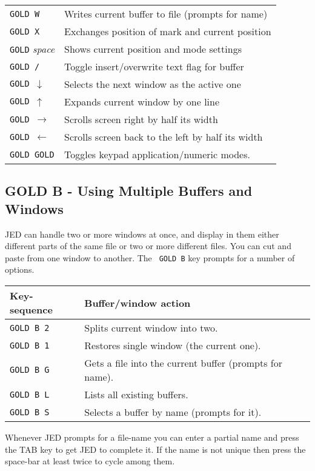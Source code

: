\documentclass[twoside,11pt]{article}
\newcommand{\xlabel}[1]{}
\begin{document}
\begin{center}
\begin{tabular}{|ll|}
\texttt{GOLD W} & Writes current buffer to file (prompts for name) \\
\texttt{GOLD X} & Exchanges position of mark and current position \\
\texttt{GOLD} \textit{space}   & Shows current position and mode settings \\
\texttt{GOLD /} & Toggle insert/overwrite text flag for buffer \\
\texttt{GOLD $\downarrow$}  & Selects the next window as the active one\\
\texttt{GOLD $\uparrow$  }  & Expands current window by one line \\
\texttt{GOLD $\rightarrow$} & Scrolls screen right by half its width \\
\texttt{GOLD $\leftarrow$ } & Scrolls screen back to the left by half its width \\
\texttt{GOLD GOLD}          & Toggles keypad application/numeric modes.\\
\hline
\end{tabular}
\end{center}


\subsection{\xlabel{gold_b_-_using_multiple_buffers_and_windows}%
GOLD B - Using Multiple Buffers and Windows}
\label{gold_b_-_using_multiple_buffers_and_windows}
\label{buff-ops}

JED can handle two or more windows at once, and display in them either
different parts of the same file or two or more different files.  You
can cut and paste from one window to another. The {\tt
GOLD B} key prompts for a number of options.

\begin{center}
\begin{tabular}{|ll|}
\hline
Key-sequence & Buffer/window action \\
\hline
\texttt{GOLD B 2} & Splits current window into two.\\
\texttt{GOLD B 1} & Restores single window (the current one).\\
\texttt{GOLD B G} & Gets a file into the current buffer (prompts for name).\\
\texttt{GOLD B L} & Lists all existing buffers.\\
\texttt{GOLD B S} & Selects a buffer by name (prompts for it).\\
\hline
\end{tabular}
\end{center}
Whenever JED prompts for a file-name you can enter a partial name and
press the TAB key to get JED to complete it.  If the name is not unique
then press the space-bar at least twice to cycle among them.
\end{document}
